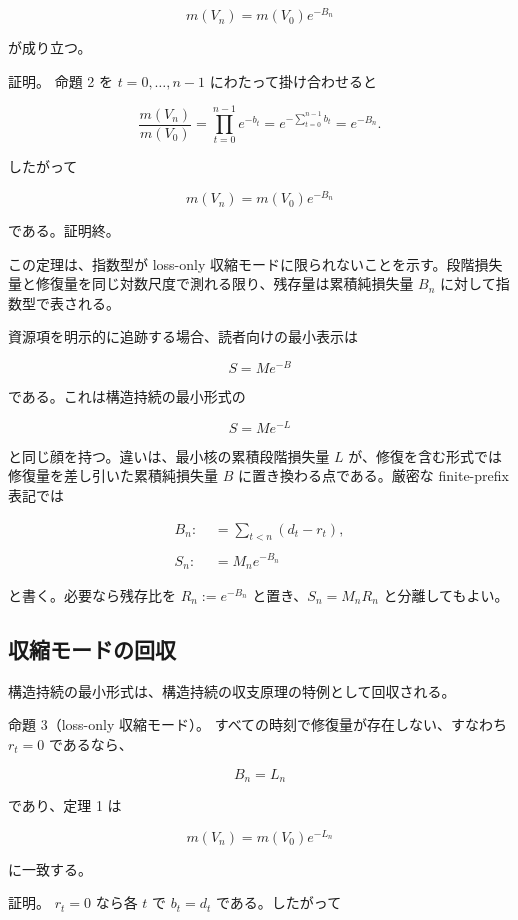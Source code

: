 \documentclass[12pt,a4paper]{article}
\begin{document}
\[
m(V_{n}) = m(V_0) e^{-B_{n}}
\]

が成り立つ。

証明。 命題 2 を \(t=0,\ldots,n-1\) にわたって掛け合わせると

\[
\frac{m(V_{n})}{m(V_0)} = \prod_{t=0}^{n-1} e^{-b_{t}} = e^{-\sum_{t=0}^{n-1} b_{t}} = e^{-B_{n}}.
\]

したがって

\[
m(V_{n}) = m(V_0) e^{-B_{n}}
\]

である。証明終。

この定理は、指数型が loss-only 収縮モードに限られないことを示す。段階損失量と修復量を同じ対数尺度で測れる限り、残存量は累積純損失量 \(B_{n}\) に対して指数型で表される。

資源項を明示的に追跡する場合、読者向けの最小表示は

\[
S = M e^{-B}
\]

である。これは構造持続の最小形式の

\[
S = M e^{-L}
\]

と同じ顔を持つ。違いは、最小核の累積段階損失量 \(L\) が、修復を含む形式では修復量を差し引いた累積純損失量 \(B\) に置き換わる点である。厳密な finite-prefix 表記では

\[
\begin{aligned}
B_{n} :&= \sum_{t<n}(d_{t}-r_{t}), \\
\qquad \\
S_{n} :&= M_{n} e^{-B_{n}}
\end{aligned}
\]

と書く。必要なら残存比を \(R_{n}:=e^{-B_{n}}\) と置き、\(S_{n}=M_{n} R_{n}\) と分離してもよい。

\subsection{収縮モードの回収}\label{ux53ceux7e2eux30e2ux30fcux30c9ux306eux56deux53ce}

構造持続の最小形式は、構造持続の収支原理の特例として回収される。

命題 3（loss-only 収縮モード）。 すべての時刻で修復量が存在しない、すなわち \(r_{t}=0\) であるなら、

\[
B_{n} = L_{n}
\]

であり、定理 1 は

\[
m(V_{n}) = m(V_0) e^{-L_{n}}
\]

に一致する。

証明。 \(r_{t}=0\) なら各 \(t\) で \(b_{t}=d_{t}\) である。したがって
\end{document}
